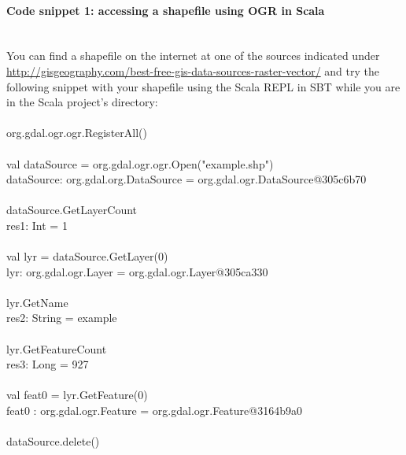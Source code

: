 \documentclass {article}
\begin{document}
\paragraph{ Code snippet 1: accessing a shapefile using OGR in Scala} 
\\
You can find a shapefile on the internet at one of the sources indicated under \href{http://gisgeography.com/best-free-gis-data-sources-raster-vector/}{http://gisgeography.com/best-free-gis-data-sources-raster-vector/} and try the following snippet with your shapefile using the Scala REPL in SBT while you are in the Scala project's directory: \\
\\
org.gdal.ogr.ogr.RegisterAll() \\
\\
val dataSource = org.gdal.ogr.ogr.Open("example.shp")\\  
dataSource: org.gdal.org.DataSource = org.gdal.ogr.DataSource@305c6b70 \\
\\
dataSource.GetLayerCount \\
res1: Int = 1 \\
\\
val lyr = dataSource.GetLayer(0) \\
lyr: org.gdal.ogr.Layer = org.gdal.ogr.Layer@305ca330 \\ 
\\
lyr.GetName \\
res2: String = example \\
\\
lyr.GetFeatureCount \\
res3: Long = 927 \\
\\
val feat0 = lyr.GetFeature(0) \\
feat0 : org.gdal.ogr.Feature = org.gdal.ogr.Feature@3164b9a0\\
\\
dataSource.delete() \\
\end{document}
